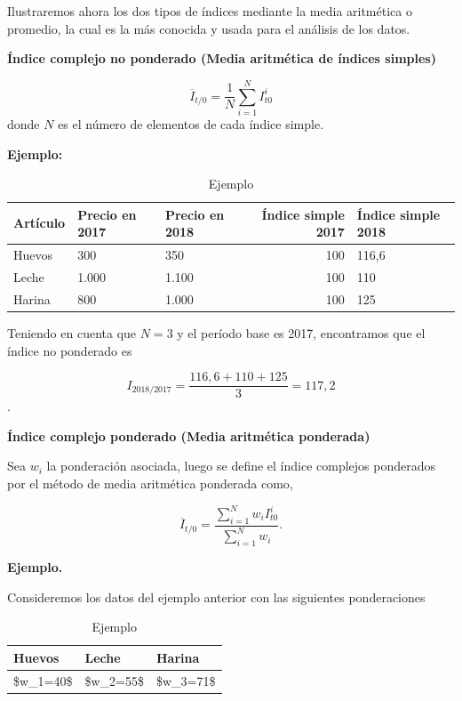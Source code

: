 \documentclass[
]{book}
\begin{document}
Ilustraremos ahora los dos tipos de índices mediante la media aritmética o promedio, la cual es la más conocida y usada para el análisis de los datos.

\textbf{Índice complejo no ponderado (Media aritmética de índices simples)}

\[ \overline{I}_{t/0}=\frac{1}{N}\sum^{N}_{i=1}I_{t0}^{i} \]
donde \(N\) es el número de elementos de cada índice simple.

\textbf{Ejemplo:}

\begin{table}

\caption{\label{tab:unnamed-chunk-7}Ejemplo}
\centering
\begin{tabular}[t]{l|l|l|r|l}
\hline
Artículo & Precio en 2017 & Precio en 2018 & Índice simple 2017 & Índice simple 2018\\
\hline
Huevos & 300 & 350 & 100 & 116,6\\
\hline
Leche & 1.000 & 1.100 & 100 & 110\\
\hline
Harina & 800 & 1.000 & 100 & 125\\
\hline
\end{tabular}
\end{table}

Teniendo en cuenta que \(N=3\) y el período base es 2017, encontramos que el índice no ponderado es

\[ I_{2018/2017}=\frac{116,6+110+125}{3}=117,2\].

\textbf{Índice complejo ponderado (Media aritmética ponderada)}

Sea \(w_i\) la ponderación asociada, luego se define el índice complejos ponderados por el método de media aritmética ponderada como,

\[ \overline{I}_{t/0}=\frac{\sum^{N}_{i=1}w_iI_{t0}^{i}}{\sum^{N}_{i=1}w_i}. \]

\textbf{Ejemplo.}

Consideremos los datos del ejemplo anterior con las siguientes ponderaciones

\begin{table}

\caption{\label{tab:unnamed-chunk-8}Ejemplo}
\centering
\begin{tabular}[t]{l|l|l}
\hline
Huevos & Leche & Harina\\
\hline
\$w\_1=40\$ & \$w\_2=55\$ & \$w\_3=71\$\\
\hline
\end{tabular}
\end{table}
\end{document}
